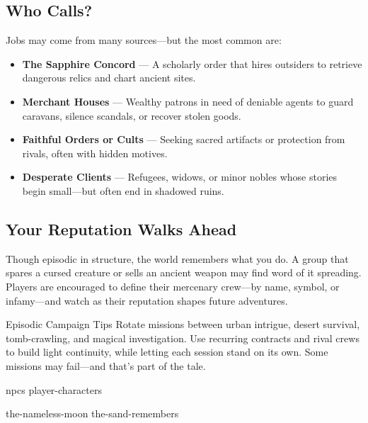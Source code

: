\subsection*{Who Calls?}

Jobs may come from many sources—but the most common are:

\begin{itemize}
    \item \textbf{The Sapphire Concord} — A scholarly order that hires outsiders to retrieve dangerous relics and chart ancient sites.
    \item \textbf{Merchant Houses} — Wealthy patrons in need of deniable agents to guard caravans, silence scandals, or recover stolen goods.
    \item \textbf{Faithful Orders or Cults} — Seeking sacred artifacts or protection from rivals, often with hidden motives.
    \item \textbf{Desperate Clients} — Refugees, widows, or minor nobles whose stories begin small—but often end in shadowed ruins.
\end{itemize}

\vspace{0.5\baselineskip}
\subsection*{Your Reputation Walks Ahead}

Though episodic in structure, the world remembers what you do. A group that spares a cursed creature or sells an ancient weapon may find word of it spreading. Players are encouraged to define their mercenary crew—by name, symbol, or infamy—and watch as their reputation shapes future adventures.

\begin{CommentBox}{Episodic Campaign Tips}
    Rotate missions between urban intrigue, desert survival, tomb-crawling, and magical investigation. Use recurring contracts and rival crews to build light continuity, while letting each session stand on its own. Some missions may fail—and that’s part of the tale.
\end{CommentBox}


{npcs}
{player-characters}


{the-nameless-moon}
{the-sand-remembers}


